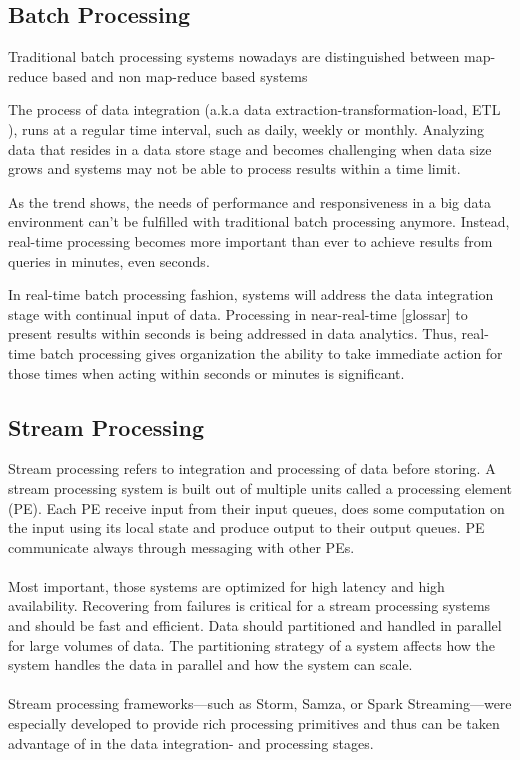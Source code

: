 \subsection{Batch Processing}
\label{intro-datastream-batchprocessing}
Traditional batch processing systems nowadays are distinguished between
map-reduce based and non map-reduce based systems 

The process of  data integration (a.k.a data extraction-transformation-load, ETL
), runs at a regular time interval, such as daily, weekly or
monthly. Analyzing data that resides in a data store stage and becomes
challenging when data size grows and systems may not be able to process results
within a time limit. \cite{Liu:2014:SRP:2628194.2628251}

As the trend shows, the needs of performance and responsiveness in a big data
environment can't be fulfilled with traditional batch processing anymore.
Instead, real-time processing becomes more important than ever to achieve
results from queries in minutes, even seconds. 
\cite{bange2013big}

In real-time batch processing fashion, systems will address the data integration stage
with continual input of data. Processing in near-real-time [glossar] to present 
results within seconds is being addressed in data analytics. Thus,
real-time batch processing gives organization the ability to take immediate action
for those times when acting within seconds or minutes is significant.
\cite{PrpSvyOfDSPS}


\subsection{Stream Processing}
\label{intro-datastream-streamprocessing}
Stream processing refers to integration and processing of data before storing. 
A stream processing system is built out of multiple units called a processing
element (PE). Each PE receive input from their input queues, does some
computation on the input using its local state and produce output to their
output queues. PE communicate always through messaging with other PEs. 
\\ \\
Most important, those systems are optimized for high latency and high
availability. Recovering from failures is critical for a stream processing
systems and should be fast and efficient. 
Data should partitioned and handled in parallel for large volumes of data. 
The partitioning strategy of a system  affects how the system
handles the data in parallel and how the system can scale. 
\cite{PrpSvyOfDSPS}
\\ \\
Stream processing frameworks---such as Storm, Samza, or Spark
Streaming---were especially developed to provide rich processing primitives and thus can be taken advantage of
in the data integration- and processing stages.

